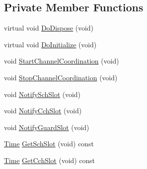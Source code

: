 \subsection*{Private Member Functions}
\begin{DoxyCompactItemize}
\item 
virtual void \hyperlink{classns3_1_1ChannelCoordinator_aea5e7c636b2c4daf6676a6905c0b3c03}{Do\+Dispose} (void)
\item 
virtual void \hyperlink{classns3_1_1ChannelCoordinator_a4e6c05c516fdaffe36cb3da5bdc5c265}{Do\+Initialize} (void)
\item 
void \hyperlink{classns3_1_1ChannelCoordinator_a4eb4a70c66f3c71ef1d0acfa262b9b38}{Start\+Channel\+Coordination} (void)
\item 
void \hyperlink{classns3_1_1ChannelCoordinator_a24d7d0c8fcd5570fdf8dbe0f201a7ab2}{Stop\+Channel\+Coordination} (void)
\item 
void \hyperlink{classns3_1_1ChannelCoordinator_a662f870387fb7bb6e3f27a6adec8f96f}{Notify\+Sch\+Slot} (void)
\item 
void \hyperlink{classns3_1_1ChannelCoordinator_afa276928ea019d3e5bf0d4761e8ca606}{Notify\+Cch\+Slot} (void)
\item 
void \hyperlink{classns3_1_1ChannelCoordinator_ac5aa1fac71a8346b1993b1462de1618a}{Notify\+Guard\+Slot} (void)
\item 
\hyperlink{classns3_1_1Time}{Time} \hyperlink{classns3_1_1ChannelCoordinator_ab4a5ca36ada46a2652d9ccf34e9457e3}{Get\+Sch\+Slot} (void) const 
\item 
\hyperlink{classns3_1_1Time}{Time} \hyperlink{classns3_1_1ChannelCoordinator_adf6f1ded8b96e7bd7aba30330726740c}{Get\+Cch\+Slot} (void) const 
\end{DoxyCompactItemize}
